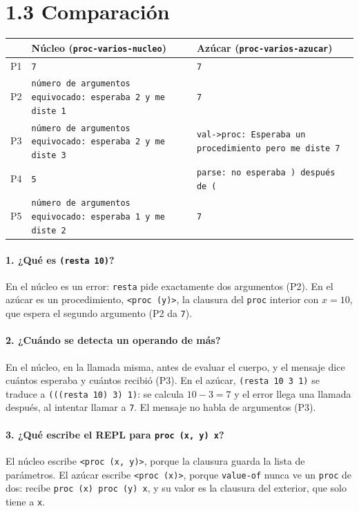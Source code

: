 \documentclass[a4paper, 10pt]{article}
\newcommand{\ttt}[1]{\texttt{#1}}
\begin{document}
\section*{1.3 Comparación}

\begin{center}
\begin{tabular}{l>{\raggedright}p{6.2cm}>{\raggedright\arraybackslash}p{6.2cm}}
\toprule
 & \textbf{Núcleo} (\ttt{proc-varios-nucleo}) & \textbf{Azúcar} (\ttt{proc-varios-azucar}) \\
\midrule
P1 & \ttt{7} & \ttt{7} \\
P2 & \ttt{número de argumentos equivocado: esperaba 2 y me diste 1} & \ttt{7} \\
P3 & \ttt{número de argumentos equivocado: esperaba 2 y me diste 3} & \ttt{val->proc: Esperaba un procedimiento pero me diste 7} \\
P4 & \ttt{5} & \ttt{parse: no esperaba \textasciigrave)\textasciigrave{} después de \textasciigrave(\textasciigrave} \\
P5 & \ttt{número de argumentos equivocado: esperaba 1 y me diste 2} & \ttt{7} \\
\bottomrule
\end{tabular}
\end{center}

\paragraph{1. ¿Qué es \ttt{(resta 10)}?}
En el núcleo es un error: \ttt{resta} pide exactamente dos argumentos (P2). En el azúcar
es un procedimiento, \ttt{<proc (y)>}, la clausura del \ttt{proc} interior con $x=10$,
que espera el segundo argumento (P2 da \ttt{7}).

\paragraph{2. ¿Cuándo se detecta un operando de más?}
En el núcleo, en la llamada misma, antes de evaluar el cuerpo, y el mensaje dice cuántos
esperaba y cuántos recibió (P3). En el azúcar, \ttt{(resta 10 3 1)} se traduce a
\ttt{(((resta 10) 3) 1)}: se calcula $10-3=7$ y el error llega una llamada después,
al intentar llamar a \ttt{7}. El mensaje no habla de argumentos (P3).

\paragraph{3. ¿Qué escribe el REPL para \ttt{proc (x, y) x}?}
El núcleo escribe \ttt{<proc (x, y)>}, porque la clausura guarda la lista de
parámetros. El azúcar escribe \ttt{<proc (x)>}, porque \ttt{value-of} nunca ve un
\ttt{proc} de dos: recibe \ttt{proc (x) proc (y) x}, y su valor es la clausura del
exterior, que solo tiene a \ttt{x}.
\end{document}
